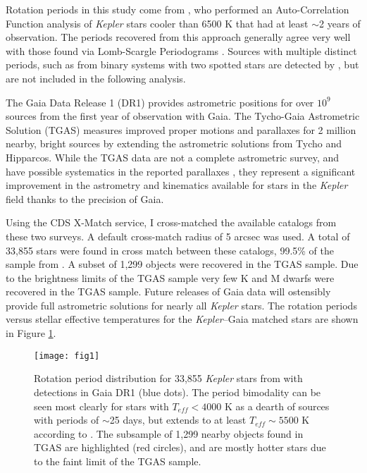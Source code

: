 \documentclass[manuscript, letterpaper]{aastex6}
\makeatletter
\let\origsection\section
\renewcommand\section{\@ifstar{\starsection}{\nostarsection}}
\newcommand\nostarsection[1]{\sectionprelude\origsection{#1}}
\newcommand\starsection[1]{\sectionprelude\origsection*{#1}}
\newcommand\sectionprelude{\vspace{1em}}
\newcommand{\Kepler}{\textsl{Kepler}\xspace}
\makeatother
\begin{document}
\section{The \Kepler--Gaia Data}
Rotation periods in this study come from \citet{mcquillan2014}, who performed an Auto-Correlation Function analysis of \Kepler stars cooler than 6500 K that had at least $\sim$2 years of observation. The periods recovered from this approach generally agree very well with those found via Lomb-Scargle Periodograms \citep[e.g.][]{reinhold2013,aigrain2015}. Sources with multiple distinct periods, such as from binary systems with two spotted stars \citep[e.g.][]{lurie2015} are detected by \citet{mcquillan2014}, but are not included in the following analysis.

The Gaia Data Release 1 (DR1) provides astrometric positions for over $10^9$ sources from the first year of observation with Gaia. The Tycho-Gaia Astrometric Solution (TGAS) measures improved proper motions and parallaxes for 2 million nearby, bright sources by extending the astrometric solutions from Tycho and Hipparcos. While the TGAS data are not a complete astrometric survey, and have possible systematics in the reported parallaxes \citep{stassun2016}, they represent a significant improvement in the astrometry and kinematics available for stars in the \Kepler field thanks to the precision of Gaia.


Using the CDS X-Match service, I cross-matched the available catalogs from these two surveys. A default cross-match radius of 5 arcsec was used. A total of 33,855 stars were found in cross match between these catalogs, 99.5\% of the sample from \citet{mcquillan2014}. 
A subset of 1,299 objects were recovered in the TGAS sample. Due to the brightness limits of the TGAS sample very few K and M dwarfs were recovered in the TGAS sample. Future releases of Gaia data will ostensibly provide full astrometric solutions for nearly all \Kepler stars. The rotation periods versus stellar effective temperatures for the \Kepler--Gaia matched stars are shown in Figure \ref{fig:all}. 



\begin{figure}[]
\centering
\texttt{[image: fig1]}
\caption{
Rotation period distribution for 33,855 \Kepler stars from \citet{mcquillan2014} with detections in Gaia DR1 (blue dots). The period bimodality can be seen most clearly for stars with $T_{eff} < 4000$ K as a dearth of sources with periods of $\sim$25 days, but extends to at least $T_{eff}\sim5500$ K according to \citet{mcquillan2014}. The subsample of 1,299 nearby objects found in TGAS are highlighted (red circles), and are mostly hotter stars due to the faint limit of the TGAS sample. 
}
\label{fig:all}
\end{figure}
\end{document}
